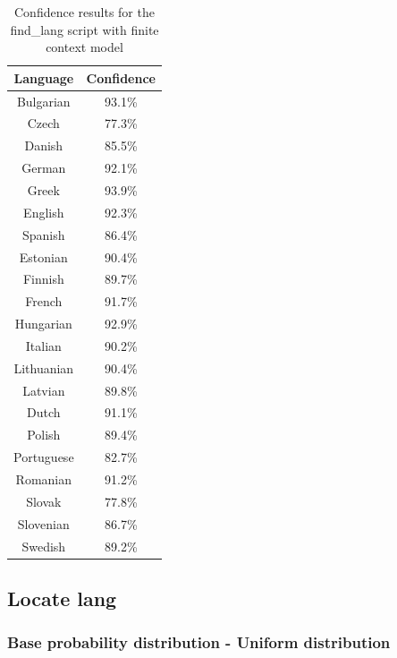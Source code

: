 \documentclass{article}
\begin{document}
\begin{table}[H]
    \centering
    \begin{tabular}{|c|c|}
        \hline
        Language & Confidence \\
        \hline
        Bulgarian & 93.1\% \\
        Czech & 77.3\% \\
        Danish & 85.5\% \\
        German & 92.1\% \\
        Greek & 93.9\% \\
        English & 92.3\% \\
        Spanish & 86.4\% \\
        Estonian & 90.4\% \\
        Finnish & 89.7\% \\
        French & 91.7\% \\
        Hungarian & 92.9\% \\
        Italian & 90.2\% \\
        Lithuanian & 90.4\% \\
        Latvian & 89.8\% \\
        Dutch & 91.1\% \\
        Polish & 89.4\% \\
        Portuguese & 82.7\% \\
        Romanian & 91.2\% \\
        Slovak & 77.8\% \\
        Slovenian & 86.7\% \\
        Swedish & 89.2\% \\
        \hline
    \end{tabular}
    \caption{Confidence results for the find_lang script with finite context model}
    \label{tab:find_lang_finite_context_confidence}
\end{table}



\subsection{Locate lang}
\label{subsec:results_locate_lang}

\subsubsection{Base probability distribution - Uniform distribution}
\label{subsubsec:results_locate_lang_uniform_distribution}
\end{document}
